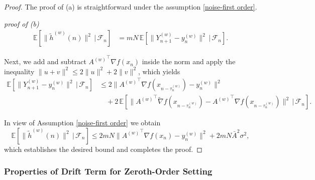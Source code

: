 \documentclass{article}
\begin{document}
\begin{proof}
    The proof of (a) is straightforward under the assumption \ref{noise-first order}.

    \emph{proof of (b)}
   \begin{equation}
\begin{aligned}
\mathbb{E}\!\left[
    \big\|\widetilde{h}^{(w)}(n)\big\|^2
    \,\big|\, \mathcal{F}_n
\right]
&= mN \,
\mathbb{E}\!\left[
    \big\|Y_{n+1}^{(w)} - y_n^{(w)}\big\|^2
    \,\big|\, \mathcal{F}_n
\right].
\end{aligned}
\label{eq:afo_second_moment_step1}
\end{equation}

Next, we add and subtract \({A^{(w)}}^\top \nabla f(x_n)\) inside the
norm and apply the inequality \(\|u+v\|^2 \le 2\|u\|^2 + 2\|v\|^2\), which
yields
\begin{equation}
\begin{aligned}
\mathbb{E}\!\left[
    \big\|Y_{n+1}^{(w)} - y_n^{(w)}\big\|^2
    \,\big|\, \mathcal{F}_n
\right]
&\le
2 \big\|{A^{(w)}}^\top \nabla f(x_{n- \tau_n^{(w)}}) - y_n^{(w)}\big\|^2 \\
&\quad
+ 2\,
\mathbb{E}\!\left[
    \big\|
        {A^{(w)}}^\top \widetilde{\nabla} f(x_{n- \tau_n^{(w)}})
        - {A^{(w)}}^\top \nabla f(x_{n- \tau_n^{(w)}})
    \big\|^2
    \,\big|\, \mathcal{F}_n
\right].
\end{aligned}
\label{eq:afo_second_moment_step2}
\end{equation}

In view of Assumption \ref{noise-first order} we obtain
\[
\mathbb{E}\!\left[
    \big\|\widetilde{h}^{(w)}(n)\big\|^2
    \,\big|\, \mathcal{F}_n
\right]
\le
2 mN
\big\|{A^{(w)}}^\top \nabla f(x_n) - y_n^{(w)}\big\|^2
+ 2 mN \bar{A}^2 \sigma^2,
\]
which establishes the desired bound and completes the proof.
\end{proof}

\subsubsection{Properties of Drift Term for Zeroth-Order Setting}
\end{document}
